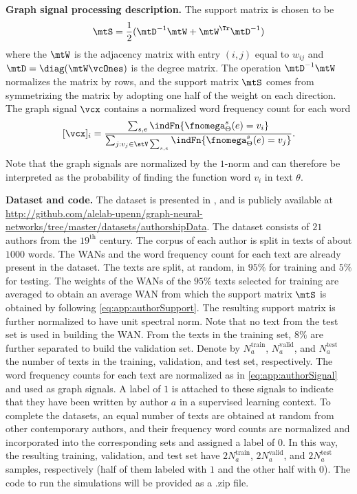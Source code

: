 \textbf{Graph signal processing description.} The support matrix is chosen to be
\begin{equation} \label{eq:app:authorSupport}
    \mtS = \frac{1}{2}(\mtD^{-1} \mtW + \mtW^{\Tr} \mtD^{-1})
\end{equation}
%
where the $\mtW$ is the adjacency matrix with entry $(i,j)$ equal to $w_{ij}$ and $\mtD = \diag(\mtW \vcOnes)$ is the degree matrix. The operation $\mtD^{-1}\mtW$ normalizes the matrix by rows, and the support matrix $\mtS$ comes from symmetrizing the matrix by adopting one half of the weight on each direction. The graph signal $\vcx$ contains a normalized word frequency count for each word
\begin{equation} \label{eq:app:authorSignal}
    [\vcx]_{i} = \frac{\sum_{s,e} \indFn\{\fnomega_{\theta}^{s}(e) = v_{i}\}}{\sum_{j : v_{j} \in \stV \sum_{s,e}} \indFn\{\fnomega_{\theta}^{s}(e) = v_{j}\}}.
\end{equation}
%
Note that the graph signals are normalized by the $1$-norm and can therefore be interpreted as the probability of finding the function word $v_{i}$ in text $\theta$.

\textbf{Dataset and code.} The dataset is presented in \cite{Segarra2015-Authorship}, and is publicly available at \url{http://github.com/alelab-upenn/graph-neural-networks/tree/master/datasets/authorshipData}. The dataset consists of $21$ authors from the $\text{19}^{\text{th}}$ century. The corpus of each author is split in texts of about $1000$ words. The WANs and the word frequency count for each text are already present in the dataset. The texts are split, at random, in $95\%$ for training and $5\%$ for testing. The weights of the WANs of the $95\%$ texts selected for training are averaged to obtain an average WAN from which the support matrix $\mtS$ is obtained by following \eqref{eq:app:authorSupport}. The resulting support matrix is further normalized to have unit spectral norm. Note that no text from the test set is used in building the WAN. From the texts in the training set, $8\%$ are further separated to build the validation set. Denote by $N_{a}^{\text{train}}$, $N_{a}^{\text{valid}}$, and $N_{a}^{\text{test}}$ the number of texts in the training, validation, and test set, respectively.  The word frequency counts for each text are normalized as in \eqref{eq:app:authorSignal} and used as graph signals. A label of $1$ is attached to these signals to indicate that they have been written by author $a$ in a supervised learning context. To complete the datasets, an equal number of texts are obtained at random from other contemporary authors, and their frequency word counts are normalized and incorporated into the corresponding sets and assigned a label of $0$. In this way, the resulting training, validation, and test set have $2N_{a}^{\text{train}}$, $2N_{a}^{\text{valid}}$, and $2N_{a}^{\text{test}}$ samples, respectively (half of them labeled with $1$ and the other half with $0$). The code to run the simulations will be provided as a .zip file.

